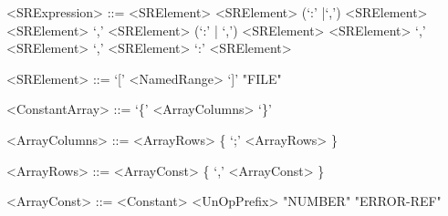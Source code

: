 \begin{grammar}
<SRExpression> ::= <SRElement>
	\alt <SRElement> (`:' |`,') <SRElement>
	\alt <SRElement> `,' <SRElement> (`:' | `,')  <SRElement>
	\alt <SRElement> `,' <SRElement> `,' <SRElement> `:' <SRElement>

<SRElement> ::= `[' <NamedRange> `]'	
	\alt "FILE"


<ConstantArray> ::= `\{' <ArrayColumns> `\}'

<ArrayColumns> ::= <ArrayRows> \{ `;' <ArrayRows> \}

<ArrayRows> ::= <ArrayConst> \{ `,' <ArrayConst> \}
	
<ArrayConst> ::= <Constant>
	\alt <UnOpPrefix> "NUMBER"
	\alt "ERROR-REF"

\end{grammar}